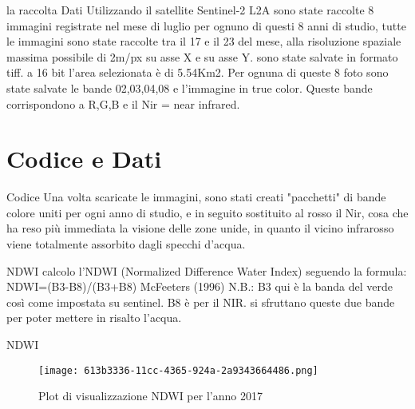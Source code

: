 \documentclass{beamer} %
\begin{document}
        \begin{frame}{ la raccolta Dati}
           Utilizzando il satellite Sentinel-2 L2A sono state raccolte 8 immagini registrate nel mese di luglio per ognuno di questi 8 anni di studio, tutte le immagini sono state raccolte tra il 17 e il 23 del mese, alla risoluzione spaziale massima possibile di 2m/px su asse X e su asse Y. sono state salvate in formato tiff. a 16 bit l'area selezionata è di 5.54Km2. Per ognuna di queste 8 foto sono state salvate le bande 02,03,04,08 e l'immagine in true color.
           Queste bande corrispondono a R,G,B e il Nir = near infrared. 
        \end{frame}

\section{Codice e Dati}

        \begin{frame}{Codice}
           Una volta scaricate le immagini, sono stati creati "pacchetti" di bande colore uniti per ogni anno di studio, e in seguito sostituito al rosso il Nir, cosa che ha reso più immediata la visione delle zone unide, in quanto il vicino infrarosso viene totalmente assorbito dagli specchi d'acqua.
        \end{frame}
       
        
    \begin{frame}{NDWI}
           calcolo l'NDWI (Normalized Difference Water Index) seguendo la formula: 
       NDWI=(B3-B8)/(B3+B8)   McFeeters (1996)
      N.B.: B3 qui è la banda del verde così come impostata su sentinel. B8 è per il NIR. 
     si sfruttano queste due bande per poter mettere in risalto l'acqua. 
       
          \end{frame}
       
       
        \begin{frame}{NDWI}
\begin{figure}
            \centering
            \texttt{[image: 613b3336-11cc-4365-924a-2a9343664486.png]}
            \caption{Plot di visualizzazione NDWI per l'anno 2017}
            \label{fig:enter-label}
        \end{figure}
                \end{frame}
 
\end{document}
